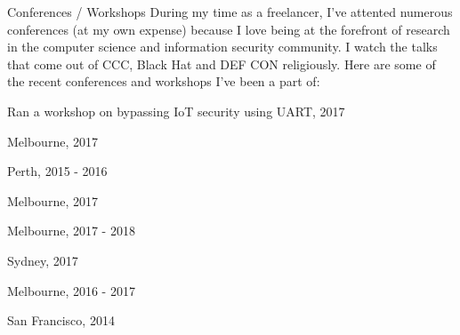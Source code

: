 \begin{cventries}
    \cventrysimple
        {Conferences / Workshops}
        {
            During my time as a freelancer, I've attented numerous conferences (at my own expense) because I love being at the forefront of research in the computer science and information security community. I watch the talks that come out of CCC, Black Hat and DEF CON religiously. Here are some of the recent conferences and workshops I've been a part of:
        }
        {
            \begin{cvitems}
                \item { \acvSubItemSep Ran a workshop on bypassing IoT security using UART, 2017}
                \item { \acvSubItemSep Melbourne, 2017}
                \item { \acvSubItemSep Perth, 2015 - 2016}
                \item { \acvSubItemSep Melbourne, 2017}
                \item { \acvSubItemSep Melbourne, 2017 - 2018}
                \item { \acvSubItemSep Sydney, 2017}
                \item { \acvSubItemSep Melbourne, 2016 - 2017}
                \item { \acvSubItemSep San Francisco, 2014}
            \end{cvitems}
        }



\end{cventries}
